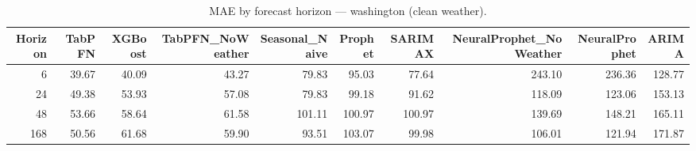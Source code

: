 \begin{table}[ht!]
\centering
\caption{MAE by forecast horizon — washington (clean weather).}
\label{tab:mae_by_horizon_washington}
\begin{tabular}{rrrrrrrrrr}
\toprule
Horizon & TabPFN & XGBoost & TabPFN_NoWeather & Seasonal_Naive & Prophet & SARIMAX & NeuralProphet_NoWeather & NeuralProphet & ARIMA \\
\midrule
6 & 39.67 & 40.09 & 43.27 & 79.83 & 95.03 & 77.64 & 243.10 & 236.36 & 128.77 \\
24 & 49.38 & 53.93 & 57.08 & 79.83 & 99.18 & 91.62 & 118.09 & 123.06 & 153.13 \\
48 & 53.66 & 58.64 & 61.58 & 101.11 & 100.97 & 100.97 & 139.69 & 148.21 & 165.11 \\
168 & 50.56 & 61.68 & 59.90 & 93.51 & 103.07 & 99.98 & 106.01 & 121.94 & 171.87 \\
\bottomrule
\end{tabular}
\end{table}
